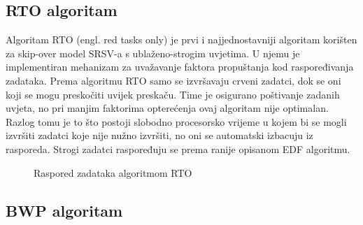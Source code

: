\documentclass[../zavrsni.tex]{subfiles}
\begin{document}
\subsection{RTO algoritam}

Algoritam RTO (engl. red tasks only) je prvi i najjednostavniji algoritam korišten za skip-over model SRSV-a s ublaženo-strogim uvjetima.
U njemu je implementiran mehanizam za uvažavanje faktora propuštanja kod raspoređivanja zadataka.
Prema algoritmu RTO samo se izvršavaju crveni zadatci, dok se oni koji se mogu preskočiti uvijek preskaču. 
Time je osigurano poštivanje zadanih uvjeta, no pri manjim 
faktorima opterećenja ovaj algoritam nije optimalan. Razlog tomu je to što postoji slobodno procesorsko vrijeme u kojem bi se mogli 
izvršiti zadatci koje nije nužno izvršiti, no oni se automatski izbacuju iz rasporeda. Strogi zadatci raspoređuju se prema 
ranije opisanom EDF algoritmu. 

\begin{figure}[h!]
    \centering

    \begin{RTGrid}[width=13cm]{3}{24}

    
  
    
    

    \end{RTGrid}

    \caption{Raspored zadataka algoritmom RTO}
    \label{fig:ex1}
  \end{figure}


\subsection{BWP algoritam}
\end{document}
